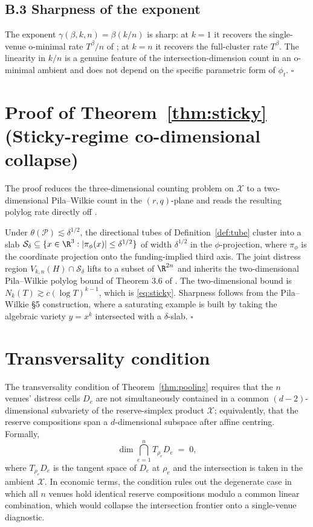 \subsection*{B.3 Sharpness of the exponent}

The exponent $\gamma(\beta,k,n) = \beta(k/n)$ is sharp: at $k = 1$
it recovers the single-venue o-minimal rate $T^\beta/n$ of
\citet{PeterzilStarchenko2009}; at $k = n$ it recovers the
full-cluster rate $T^\beta$. The linearity in $k/n$ is a genuine
feature of the intersection-dimension count in an o-minimal
ambient and does not depend on the specific parametric form of
$\phi_t$. $\square$

\section{Proof of Theorem~\ref{thm:sticky} (Sticky-regime
co-dimensional collapse)}\label{app:thm-sticky}

The proof reduces the three-dimensional counting problem on
$\mathcal{X}$ to a two-dimensional Pila--Wilkie count in the
$(r,q)$-plane and reads the resulting polylog rate directly off
\citet[Theorem 3.6]{PilaWilkie2006}.

Under $\theta(\mathcal{P}) \lesssim \delta^{1/2}$, the directional
tubes of Definition~\ref{def:tube} cluster into a slab
$\mathcal{S}_\delta \subseteq
\{x \in \R^3 : |\pi_\phi(x)| \le \delta^{1/2}\}$
of width $\delta^{1/2}$ in the $\phi$-projection, where $\pi_\phi$
is the coordinate projection onto the funding-implied third axis.
The joint distress region $V_{k,n}(H) \cap \mathcal{S}_\delta$
lifts to a subset of $\R^{2n}$ and inherits the two-dimensional
Pila--Wilkie polylog bound of Theorem 3.6 of
\citet{PilaWilkie2006}. The two-dimensional bound is
$N_k(T) \gtrsim c(\log T)^{k-1}$,
which is \eqref{eq:sticky}. Sharpness follows from the
Pila--Wilkie \S 5 construction, where a saturating example is
built by taking the algebraic variety $y = x^k$ intersected with
a $\delta$-slab. $\square$

\section{Transversality condition}\label{app:trans}

The transversality condition of Theorem~\ref{thm:pooling} requires
that the $n$ venues' distress cells $D_e$ are not simultaneously
contained in a common $(d-2)$-dimensional subvariety of the
reserve-simplex product $\mathcal{X}$; equivalently, that the
reserve compositions span a $d$-dimensional subspace after affine
centring. Formally,
\[
\dim \bigcap_{e=1}^{n} T_{\rho_e} D_e \;=\; 0,
\]
where $T_{\rho_e} D_e$ is the tangent space of $D_e$ at $\rho_e$
and the intersection is taken in the ambient $\mathcal{X}$. In
economic terms, the condition rules out the degenerate case in
which all $n$ venues hold identical reserve compositions modulo a
common linear combination, which would collapse the intersection
frontier onto a single-venue diagnostic.

